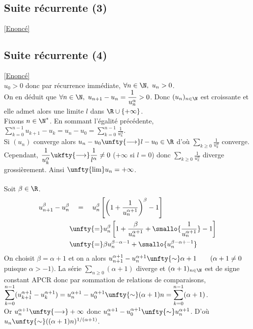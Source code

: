 \documentclass{book}
\begin{document}
	\subsection{Suite récurrente (3)}\label{sec:suite-recurrente-3}
	\textcolor{blue}{\hyperref[Suite récurrente 3]{[Enoncé]}}\\
	
	\subsection{Suite récurrente (4) }\label{sec:suite-recurrente-4-etoile3}
	\textcolor{blue}{\hyperref[Suite récurrente 4]{[Enoncé]}}\\
	$u_0>0$ donc par récurrence immédiate, $\forall n \in \N,\ u_n>0$.\\
	On en déduit que $\forall n\in \N,\ u_{n+1}-u_n=\displaystyle\frac{1}{u_n^\alpha}>0$. Donc $(u_n)_{n\in \N}$ est croissante et elle admet alors une limite $l$ dans $\R\cup \{+\infty\}$.\\
	Fixons $n\in \N^*$. En sommant l'égalité précédente, $\displaystyle\sum\limits_{k=0}^{n-1} u_{k+1}-u_k=u_n-u_0=\displaystyle\sum\limits_{k=0}^{n-1} \frac{1}{u_k^\alpha}$.\\
	Si $(u_n)$ converge alors $u_n-u_0\unfty{\longrightarrow} l-u_0\in \R$ d'où $\displaystyle\sum\limits_{k\geq 0} \frac{1}{u_k^\alpha}$ converge. Cependant, $\displaystyle\frac{1}{u_k^\alpha}\ukfty{\longrightarrow} \displaystyle\frac{1}{l^\alpha}\ne 0$ ($+\infty$ si $l=0$) donc $\displaystyle\sum\limits_{k\geq 0} \frac{1}{u_k^\alpha}$ diverge grossièrement. Ainsi $\unfty{\lim} u_n=+\infty$.\\\\
	Soit $\beta\in \R$.
	\begin{align*}
		u_{n+1}^\beta-u_n^\beta&\ \ \ =\ \ \ u_n^\beta\left[\left(1+\displaystyle\frac{1}{u_n^{\alpha+1}}\right)^\beta-1\right]\\
		&\unfty{=}u_n^\beta\left[1+\displaystyle\frac{\beta}{u_n^{\alpha+1}}+\smallo{\displaystyle\frac{1}{u_n^{\alpha+1}}}-1\right]\\
		&\unfty{=}\beta u_n^{\beta-\alpha-1}+\smallo{u_n^{\beta-\alpha+-1}}
	\end{align*}
	On choisit $\beta=\alpha+1$ et on a alors $u_{n+1}^{\alpha+1}-u_n^{\alpha+1}\unfty{\sim}\alpha+1\ \ \ \ \ \ (\alpha+1\ne 0$ puisque $\alpha>-1)$. La série $\displaystyle\sum\limits_{n\geq 0}(\alpha+1)$ diverge et $(\alpha+1)_{n\in \N}$ est de signe constant APCR donc par sommation de relations de comparaisons,\\
	$\displaystyle\sum\limits_{k=0}^{n-1}(u_{k+1}^{\alpha+1}-u_k^{\alpha+1})=u_n^{\alpha+1}-u_0^{\alpha+1}\unfty{\sim}(\alpha+1)n=\displaystyle\sum\limits_{k=0}^{n-1}(\alpha+1)$.\\
	Or $u_n^{\alpha+1}\unfty{\longrightarrow}+\infty$ donc $u_n^{\alpha+1}-u_0^{\alpha+1}\unfty{\sim}u_n^{\alpha+1}$. D'où $u_n\unfty{\sim}((\alpha+1)n)^{1/(\alpha+1)}$.
	
\end{document}
